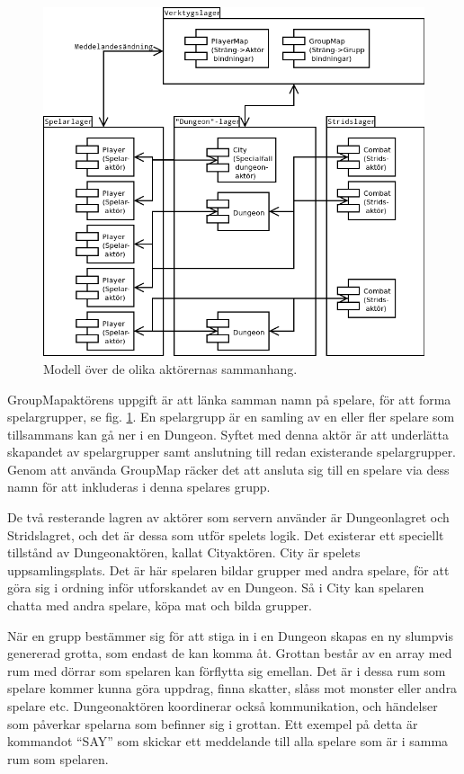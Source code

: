 \documentclass[a4paper]{article}
\begin{document}
\begin{figure}[hbt]
\centering
\includegraphics[width=1.0\textwidth]{serverActorModel2-2}
\caption{\label{fig:ServerActorModel}Modell över de olika aktörernas sammanhang.}
\end{figure}

GroupMapaktörens uppgift är att länka samman namn på spelare, för att forma spelargrupper, se fig. \ref{fig:ServerActorModel}. En spelargrupp är en samling av en eller fler spelare som tillsammans kan gå ner i en Dungeon. Syftet med denna aktör är att underlätta skapandet av spelargrupper samt anslutning till redan existerande spelargrupper. Genom att använda GroupMap räcker det att ansluta sig till en spelare via dess namn för att inkluderas i denna spelares grupp.

De två resterande lagren av aktörer som servern använder är Dungeonlagret och Stridslagret, och det är dessa som utför spelets logik. Det existerar ett speciellt tillstånd av Dungeonaktören, kallat Cityaktören. City är spelets uppsamlingsplats. Det är här spelaren bildar grupper med andra spelare, för att göra sig i ordning inför utforskandet av en Dungeon. Så i City kan spelaren chatta med andra spelare, köpa mat och bilda grupper.

När en grupp bestämmer sig för att stiga in i en Dungeon skapas en ny slumpvis genererad grotta, som endast de kan komma åt. Grottan består av en array med rum med dörrar som spelaren kan förflytta sig emellan. Det är i dessa rum som spelare kommer kunna göra uppdrag, finna skatter, slåss mot monster eller andra spelare etc. Dungeonaktören koordinerar också kommunikation, och händelser som påverkar spelarna som befinner sig i grottan. Ett exempel på detta är kommandot “SAY”  som skickar ett meddelande till alla spelare som är i samma rum som spelaren. 
\end{document}
